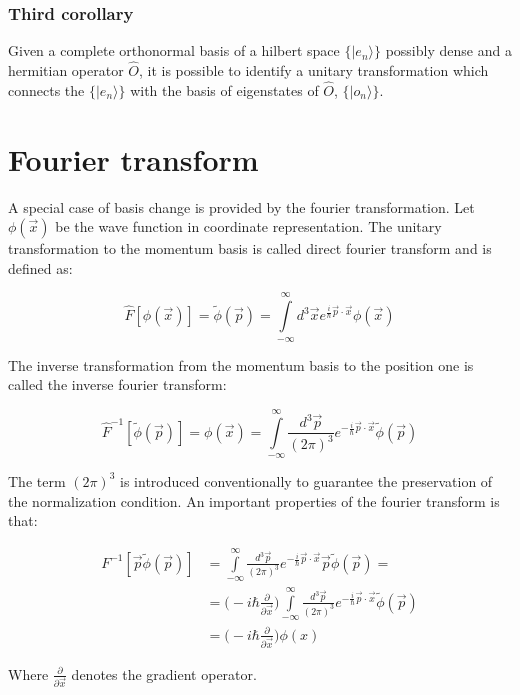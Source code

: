 		\subsubsection{Third corollary}
		Given a complete orthonormal basis of a hilbert space $\{|e_n\rangle\}$ possibly dense and a hermitian operator $\hat{O}$, it is possible to identify a unitary transformation which connects the $\{|e_n\rangle\}$ with the basis of eigenstates of $\hat{O}$, $\{|o_n\rangle\}$.

\section{Fourier transform}
A special case of basis change is provided by the fourier transformation.
Let $\phi(\vec{x})$ be the wave function in coordinate representation.
The unitary transformation to the momentum basis is called direct fourier transform and is defined as:

$$\hat{F}[\phi(\vec{x})] = \tilde{\phi}(\vec{p}) = \int\limits_{-\infty}^\infty d^3\vec{x}e^{\frac{i}{\hbar}\vec{p}\cdot\vec{x}}\phi(\vec{x})$$

The inverse transformation from the momentum basis to the position one is called the inverse fourier transform:

$$\hat{F}^{-1}[\tilde{\phi}(\vec{p})] = \phi(\vec{x}) = \int\limits_{-\infty}^\infty \frac{d^3\vec{p}}{(2\pi)^3}e^{-\frac{i}{\hbar}\vec{p}\cdot\vec{x}}\tilde{\phi}(\vec{p})$$

The term $(2\pi)^3$ is introduced conventionally to guarantee the preservation of the normalization condition.
An important properties of the fourier transform is that:

\begin{align*}
	F^{-1}[\vec{p}\tilde{\phi}(\vec{p})] &= \int\limits_{-\infty}^\infty \frac{d^3\vec{p}}{(2\pi)^3}e^{-\frac{i}{\hbar}\vec{p}\cdot\vec{x}}\vec{p}\tilde{\phi}(\vec{p})=\\
					     & = \biggl(-i\hbar\frac{\partial}{\partial \vec{x}}\biggr)\int\limits_{-\infty}^\infty \frac{d^3\vec{p}}{(2\pi)^3}e^{-\frac{i}{\hbar}\vec{p}\cdot\vec{x}}\tilde{\phi}(\vec{p})\\
					     & = \biggl(-i\hbar\frac{\partial}{\partial \vec{x}}\biggr)\phi(x)
\end{align*}

Where $\frac{\partial}{\partial\vec{x}}$ denotes the gradient operator.

